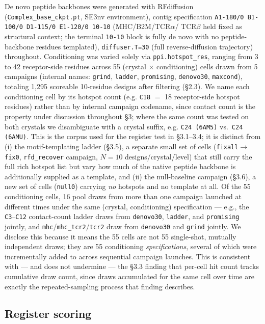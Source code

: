 \documentclass[letterpaper]{article}
\begin{document}
De novo peptide backbones were generated with RFdiffusion (\texttt{Complex\_base\_ckpt.pt}, SE3nv
environment), contig specification \texttt{A1-180/0 B1-100/0 D1-115/0 E1-120/0 10-10} (MHC/B2M/TCR$\alpha$/
TCR$\beta$ held fixed as structural context; the terminal \texttt{10-10} block is fully de novo with no
peptide-backbone residues templated), \texttt{diffuser.T=30} (full reverse-diffusion trajectory)
throughout. Conditioning was varied solely via \texttt{ppi.hotspot\_res}, ranging from 3 to 42
receptor-side residues across 55 (crystal $\times$ conditioning) cells drawn from 5 campaigns (internal
names: \texttt{grind}, \texttt{ladder}, \texttt{promising}, \texttt{denovo30}, \texttt{maxcond}), totaling
1,295 scoreable 10-residue designs after filtering (\S2.3). We name each conditioning cell by its hotspot
count (e.g. \texttt{C18} $=$ 18 receptor-side hotspot residues) rather than by internal campaign codename,
since contact count is the property under discussion throughout \S3; where the same count was tested on
both crystals we disambiguate with a crystal suffix, e.g. \texttt{C24 (6AM5)} vs.\ \texttt{C24 (6AMU)}.
This is the corpus used for the register test in \S3.1--3.4; it is distinct from (i) the motif-templating
ladder (\S3.5), a separate small set of cells (\texttt{fixall}$\rightarrow$\texttt{fix0},
\texttt{rfd\_recover} campaign, $N=10$ designs/crystal/level) that still carry the full rich hotspot list
but vary how much of the native peptide backbone is additionally supplied as a template, and (ii) the
null-baseline campaign (\S3.6), a new set of cells (\texttt{null0}) carrying \textit{no} hotspots and no
template at all. Of the 55 conditioning cells, 16 pool draws from more than one campaign launched at
different times under the same (crystal, conditioning) specification --- e.g., the \texttt{C3}--\texttt{C12}
contact-count ladder draws from \texttt{denovo30}, \texttt{ladder}, and \texttt{promising} jointly, and
\texttt{mhc}/\texttt{mhc\_tcr2}/\texttt{tcr2} draw from \texttt{denovo30} and \texttt{grind} jointly. We
disclose this because it means the 55 cells are not 55 single-shot, mutually independent draws; they are
55 conditioning \textit{specifications}, several of which were incrementally added to across sequential
campaign launches. This is consistent with --- and does not undermine --- the \S3.3 finding that per-cell
hit count tracks cumulative draw count, since draws accumulated for the same cell over time are exactly
the repeated-sampling process that finding describes.

\subsection{Register scoring}
\end{document}
